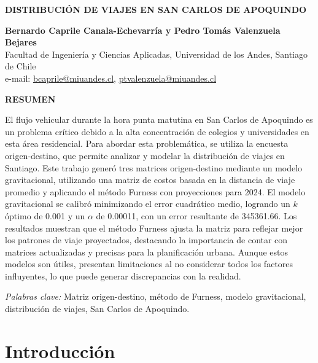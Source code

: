 \documentclass[letterpaper,12pt]{article}
\begin{document}
\begin{titlepage}
    \begin{center}
      \vspace*{1cm}

    \textbf{\Large DISTRIBUCIÓN DE VIAJES EN SAN CARLOS DE APOQUINDO}
    
    \vspace{1cm}
    
    \textbf{Bernardo Caprile Canala-Echevarría y Pedro Tomás Valenzuela Bejares}\\
    Facultad de Ingeniería y Ciencias Aplicadas, Universidad de los Andes, Santiago de Chile\\
    e-mail: \href{mailto:bcaprile@miuandes.cl}{bcaprile@miuandes.cl}, \href{mailto: ptvalenzuela@miuandes.cl}{ptvalenzuela@miuandes.cl}
    
    \vspace{2cm}
    
    \textbf{RESUMEN}
    
     
    \end{center}
    El flujo vehicular durante la hora punta matutina en San Carlos de Apoquindo es un problema crítico debido a la alta concentración de colegios y universidades en esta área residencial. Para abordar esta problemática, se utiliza la encuesta origen-destino, que permite analizar y modelar la distribución de viajes en Santiago. Este trabajo generó tres matrices origen-destino mediante un modelo gravitacional, utilizando una matriz de costos basada en la distancia de viaje promedio y aplicando el método Furness con proyecciones para 2024. El modelo gravitacional se calibró minimizando el error cuadrático medio, logrando un \( k \) óptimo de 0.001 y un \( \alpha \) de 0.00011, con un error resultante de 345361.66. Los resultados muestran que el método Furness ajusta la matriz para reflejar mejor los patrones de viaje proyectados, destacando la importancia de contar con matrices actualizadas y precisas para la planificación urbana. Aunque estos modelos son útiles, presentan limitaciones al no considerar todos los factores influyentes, lo que puede generar discrepancias con la realidad.


    \vspace{0.5cm} 
    \textit{Palabras clave:} Matriz origen-destino, método de Furness, modelo gravitacional, distribución de viajes, San Carlos de Apoquindo.
\end{titlepage}

\newpage

\section{Introducción}
\end{document}
